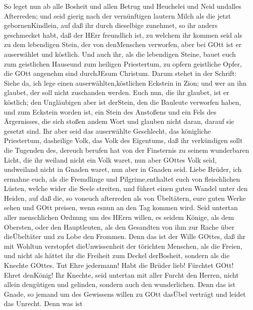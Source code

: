  So leget nun ab alle Bosheit und allen Betrug und Heuchelei
und Neid undalles Afterreden;  und seid gierig nach der
vernünftigen lautern Milch als die jetzt gebornenKindlein, auf daß ihr
durch dieselbige zunehmet,  so ihr anders geschmecket habt,
daß der HErr freundlich ist,  zu welchem ihr kommen seid als
zu dem lebendigen Stein, der von denMenschen verworfen, aber bei GOtt
ist er auserwählet und köstlich.  Und auch ihr, als die
lebendigen Steine, bauet euch zum geistlichen Hauseund zum heiligen
Priestertum, zu opfern geistliche Opfer, die GOtt angenehm sind
durchJEsum Christum.  Darum stehet in der Schrift: Siehe da,
ich lege einen auserwählten,köstlichen Eckstein in Zion; und wer an ihn
glaubet, der soll nicht zuschanden werden.  Euch nun, die
ihr glaubet, ist er köstlich; den Ungläubigen aber ist derStein, den die
Bauleute verworfen haben, und zum Eckstein worden ist,  ein
Stein des Anstoßens und ein Fels des Ärgernisses, die sich stoßen andem
Wort und glauben nicht daran, darauf sie gesetzt sind.  Ihr
aber seid das auserwählte Geschlecht, das königliche Priestertum,
dasheilige Volk, das Volk des Eigentums, daß ihr verkündigen sollt die
Tugenden des, dereuch berufen hat von der Finsternis zu seinem
wunderbaren Licht,  die ihr weiland nicht ein Volk waret,
nun aber GOttes Volk seid, undweiland nicht in Gnaden waret, nun aber in
Gnaden seid.  Liebe Brüder, ich ermahne euch, als die
Fremdlinge und Pilgrime,enthaltet euch von fleischlichen Lüsten, welche
wider die Seele streiten,  und führet einen guten Wandel
unter den Heiden, auf daß die, so voneuch afterreden als von Übeltätern,
eure guten Werke sehen und GOtt preisen, wenn esnun an den Tag kommen
wird.  Seid untertan aller menschlichen Ordnung um des
HErrn willen, es seidem Könige, als dem Obersten,  oder den
Hauptleuten, als den Gesandten von ihm zur Rache über dieÜbeltäter und
zu Lobe den Frommen.  Denn das ist der Wille GOttes, daß
ihr mit Wohltun verstopfet dieUnwissenheit der törichten Menschen,
 als die Freien, und nicht als hättet ihr die Freiheit zum
Deckel derBosheit, sondern als die Knechte GOttes.  Tut
Ehre jedermann! Habt die Brüder lieb! Fürchtet GOtt! Ehret denKönig!
 Ihr Knechte, seid untertan mit aller Furcht den Herren,
nicht allein dengütigen und gelinden, sondern auch den wunderlichen.
 Denn das ist Gnade, so jemand um des Gewissens willen zu
GOtt dasÜbel verträgt und leidet das Unrecht.  Denn was ist
